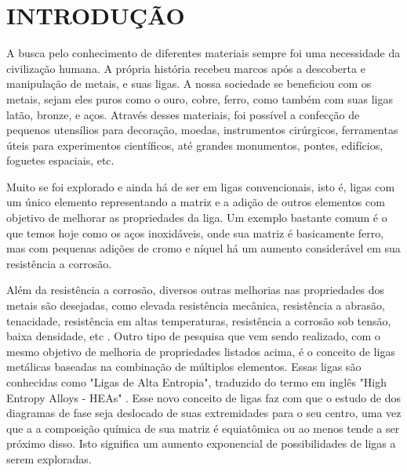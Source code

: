 
\chapter{INTRODUÇÃO}

A busca pelo conhecimento de diferentes materiais sempre foi uma necessidade da civilização humana. A própria história recebeu marcos após a descoberta e manipulação de metais, e suas ligas. A nossa sociedade se beneficiou com os metais, sejam eles puros como o ouro, cobre, ferro, como também com suas ligas latão, bronze, e aços. Através desses materiais, foi possível a confecção de pequenos utensílios para decoração, moedas, instrumentos cirúrgicos, ferramentas úteis para experimentos científicos, até grandes monumentos, pontes, edifícios, foguetes espaciais, etc. 

Muito se foi explorado e ainda há de ser em ligas convencionais, isto é, ligas com um único elemento representando a matriz e a adição de outros elementos com objetivo de melhorar as propriedades da liga. Um exemplo bastante comum é o que temos hoje como os aços inoxidáveis, onde sua matriz é basicamente ferro, mas com pequenas adições de cromo e níquel há um aumento considerável em sua resistência a corrosão. 

Além da resistência a corrosão, diversos outras melhorias nas propriedades dos metais são desejadas, como elevada resistência mecânica, resistência a abrasão, tenacidade, resistência em altas temperaturas, resistência a corrosão sob tensão, baixa densidade, etc \cite{jien2006recent}.               
Outro tipo de pesquisa que vem sendo realizado, com o mesmo objetivo de melhoria de propriedades listados acima, é o conceito de ligas metálicas baseadas na combinação de múltiplos elementos. Essas ligas são conhecidas como "Ligas de Alta Entropia", traduzido do termo em inglês "High Entropy Alloys - HEAs" \cite{yeh2004nanostructured}. Esse novo conceito de ligas faz com que o estudo de dos diagramas de fase seja deslocado de suas extremidades para o seu centro, uma vez que a a composição química de sua matriz é equiatômica ou ao menos tende a ser próximo disso. Isto significa um aumento exponencial de possibilidades de ligas a serem exploradas.



\bigskip
